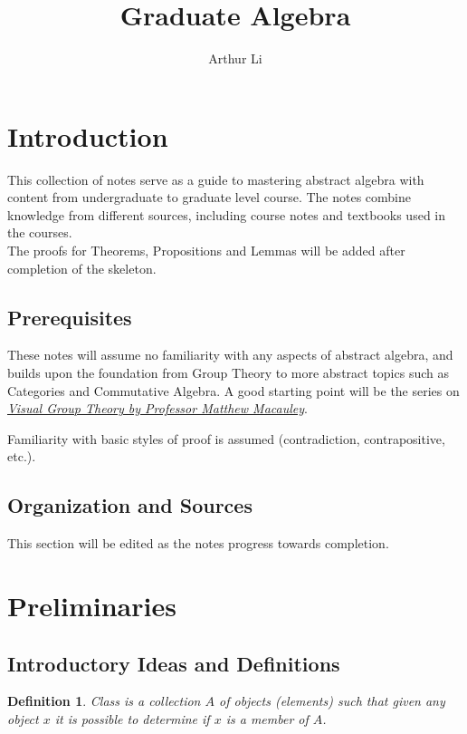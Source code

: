 \documentclass[a4paper,8pt]{article}
\title{Graduate Algebra}
\author{Arthur Li}
\theoremstyle{theorem}
\newtheorem{definition}[theorem]{Definition}
\begin{document}
\maketitle


\section*{Introduction}
{This collection} of notes serve as a guide to mastering abstract algebra with content from undergraduate to graduate level course. The notes combine knowledge from different sources, including course notes and textbooks used in the courses.\\

The proofs for Theorems, Propositions and Lemmas will be added after completion of the skeleton.
	
\subsection*{Prerequisites}
These notes will assume no familiarity with any aspects of abstract algebra, and builds upon the foundation from Group Theory to more abstract topics such as Categories and Commutative Algebra. A good starting point will be the series on   \textit{{\color{blue} \href{https://www.youtube.com/watch?v=UwTQdOop-nU&list=PLwV-9DG53NDxU337smpTwm6sef4x-SCLv}{Visual Group Theory by Professor Matthew Macauley}}}.
	
Familiarity with basic styles of proof is assumed (contradiction, contrapositive, etc.).
	
\subsection*{Organization and Sources}
This section will be edited as the notes progress towards completion.

\newpage

\tableofcontents

\newpage

\section{Preliminaries}

\subsection{Introductory Ideas and Definitions}

\begin{definition}
\textit{{\color{blue} Class}} is a collection $ A $ of objects (elements) such that given any object $ x $ it is possible to determine if $ x $ is a member of $ A $.\\
\end{definition}
\end{document}
